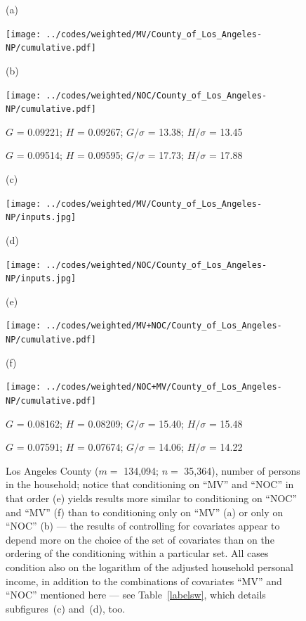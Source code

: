 \documentclass{article}
\newlength{\vertsep}
\newlength{\imsize}
\newlength{\imsized}
\begin{document}
\begin{figure}
\begin{centering}

(a) \parbox{\imsize}{\texttt{[image: ../codes/weighted/MV/County\_of\_Los\_Angeles-NP/cumulative.pdf]}}
\quad\quad
(b) \parbox{\imsize}{\texttt{[image: ../codes/weighted/NOC/County\_of\_Los\_Angeles-NP/cumulative.pdf]}}

\parbox{\imsized}{\hfil \footnotesize $G$ = 0.09221; $H$ = 0.09267;
$G/\sigma$ = 13.38; $H/\sigma$ = 13.45}
\parbox{\imsized}{\hfil \footnotesize $G$ = 0.09514; $H$ = 0.09595;
$G/\sigma$ = 17.73; $H/\sigma$ = 17.88}

\vspace{\vertsep}

(c) \parbox{\imsize}{\texttt{[image: ../codes/weighted/MV/County\_of\_Los\_Angeles-NP/inputs.jpg]}}
\quad\quad
(d) \parbox{\imsize}{\texttt{[image: ../codes/weighted/NOC/County\_of\_Los\_Angeles-NP/inputs.jpg]}}

\vspace{\vertsep}

(e) \parbox{\imsize}{\texttt{[image: ../codes/weighted/MV+NOC/County\_of\_Los\_Angeles-NP/cumulative.pdf]}}
\quad\quad
(f) \parbox{\imsize}{\texttt{[image: ../codes/weighted/NOC+MV/County\_of\_Los\_Angeles-NP/cumulative.pdf]}}

\parbox{\imsized}{\hfil \footnotesize $G$ = 0.08162; $H$ = 0.08209;
$G/\sigma$ = 15.40; $H/\sigma$ = 15.48}
\parbox{\imsized}{\hfil \footnotesize $G$ = 0.07591; $H$ = 0.07674;
$G/\sigma$ = 14.06; $H/\sigma$ = 14.22}

\end{centering}
\caption{Los Angeles County ($m =$ 134,094; $n =$ 35,364),
number of persons in the household;
notice that conditioning on ``MV'' and ``NOC'' in that order (e)
yields results more similar to conditioning on ``NOC'' and ``MV'' (f)
than to conditioning only on ``MV'' (a) or only on ``NOC'' (b) ---
the results of controlling for covariates appear to depend more on the choice
of the set of covariates than on the ordering of the conditioning
within a particular set. All cases condition also on the logarithm
of the adjusted household personal income, in addition to the combinations
of covariates ``MV'' and ``NOC'' mentioned here --- see Table~\ref{labelsw},
which details subfigures~(c) and~(d), too.}
\label{los_angeles}
\end{figure}
\end{document}
